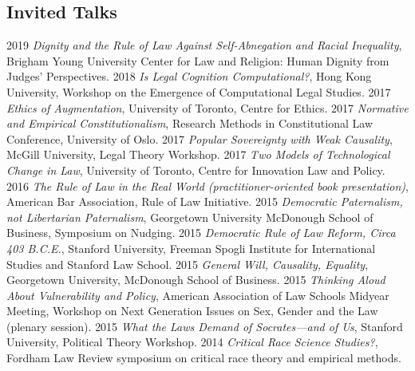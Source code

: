 \documentclass[letterpaper]{moderncv}
\begin{document}
\subsection{Invited Talks}
\cvitem
{2019}
{\textit{Dignity and the Rule of Law Against Self-Abnegation and Racial Inequality}, Brigham Young University Center for Law and Religion: Human Dignity from Judges' Perspectives.}
\vspace{1mm}
\cvitem
{2018}
{\textit{Is Legal Cognition Computational?}, Hong Kong University, Workshop on the Emergence of Computational Legal Studies.}
\vspace{1mm}
\cvitem
{2017}
{\textit{Ethics of Augmentation}, University of Toronto, Centre for Ethics.}
\vspace{1mm}
\cvitem
{2017}
{\textit{Normative and Empirical Constitutionalism}, Research Methods in Constitutional Law Conference, University of Oslo.}
\vspace{1mm}
\cvitem
{2017}
{\textit{Popular Sovereignty with Weak Causality}, McGill University, Legal Theory Workshop.}
\vspace{1mm}
\cvitem
{2017}
{\textit{Two Models of Technological Change in Law}, University of Toronto, Centre for Innovation Law and Policy.}
\vspace{1mm}
\cvitem
{2016}
{\textit{The Rule of Law in the Real World (practitioner-oriented book presentation)}, American Bar Association, Rule of Law Initiative.}
\vspace{1mm}
\cvitem
{2015}
{\textit{Democratic Paternalism, not Libertarian Paternalism}, Georgetown University McDonough School of Business, Symposium on Nudging.}
\vspace{1mm}
\cvitem
{2015}
{\textit{Democratic Rule of Law Reform, Circa 403 B.C.E.}, Stanford University, Freeman Spogli Institute for International Studies and Stanford Law School.}
\vspace{1mm}
\cvitem
{2015}
{\textit{General Will, Causality, Equality}, Georgetown University, McDonough School of Business.}
\vspace{1mm}
\cvitem
{2015}
{\textit{Thinking Aloud About Vulnerability and Policy}, American Association of Law Schools Midyear Meeting, Workshop on Next Generation Issues on Sex, Gender and the Law (plenary session).}
\vspace{1mm}
\cvitem
{2015}
{\textit{What the Laws Demand of Socrates---and of Us}, Stanford University, Political Theory Workshop.}
\vspace{1mm}
\cvitem
{2014}
{\textit{Critical Race Science Studies?}, Fordham Law Review symposium on critical race theory and empirical methods.}
\end{document}
